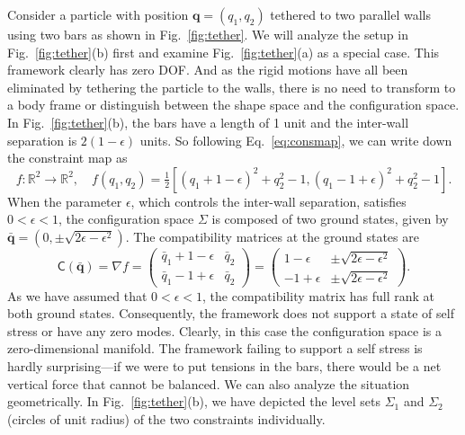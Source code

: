 \begin{example*}
  Consider a particle with position $\bm{q} = (q_{1}, q_{2})$ tethered to two parallel walls using two bars as shown in Fig.~\ref{fig:tether}.
  We will analyze the setup in Fig.~\ref{fig:tether}(b) first and examine Fig.~\ref{fig:tether}(a)
  as a special case.
This framework clearly has zero DOF.
And as the rigid motions have all been eliminated by tethering the particle to the walls, there is no need to transform to a body frame or distinguish between the shape space and the configuration space.
In Fig.~\ref{fig:tether}(b), the bars have a length of 1 unit and the inter-wall separation is $2(1 - \epsilon)$ units. 
So following Eq.~\eqref{eq:consmap}, we can write down the constraint map as
%
\begin{equation}
  f: \mathbb{R}^{2} \to \mathbb{R}^{2},
  \quad
  f(q_{1}, q_{2}) = \tfrac{1}{2}\left[(q_{1} + 1 - \epsilon)^{2} + q_{2}^{2} - 1, (q_{1}-1 + \epsilon)^{2} + q_{2}^{2} - 1\right].
\end{equation}
%
When the parameter $\epsilon$, which controls the inter-wall separation, satisfies $0 < \epsilon < 1$, the configuration space $\Sigma$ is composed of two ground states, given by $\bar{\bm{q}} = (0, \pm\sqrt{2\epsilon - \epsilon^{2}})$.
%
The compatibility matrices at the ground states are
%
\begin{equation}
  \mathsf{C}(\bar{\bm{q}}) = \nabla f = \begin{pmatrix}
    \bar{q}_{1} + 1 - \epsilon & \bar{q}_{2}\\
    \bar{q}_{1} - 1 + \epsilon & \bar{q}_{2}
  \end{pmatrix}
  =
  \begin{pmatrix}
     1-\epsilon & \pm\sqrt{2\epsilon - \epsilon^{2}}\\
    -1+\epsilon & \pm\sqrt{2\epsilon - \epsilon^{2}}
  \end{pmatrix}.
\end{equation}
%
As we have assumed that $0 < \epsilon < 1$, the compatibility matrix has full rank at both ground states. 
Consequently, the framework does not support a state of self stress or have any zero modes.
Clearly, in this case the configuration space is a zero-dimensional manifold.
The framework failing to support a self stress is hardly surprising---if we were to put tensions in the bars, there would be a net vertical force that cannot be balanced.
We can also analyze the situation geometrically.
In Fig.~\ref{fig:tether}(b), we have depicted the level sets $\Sigma_{1}$ and $\Sigma_{2}$ (circles of unit radius) of the two constraints individually.

\end{example*}
